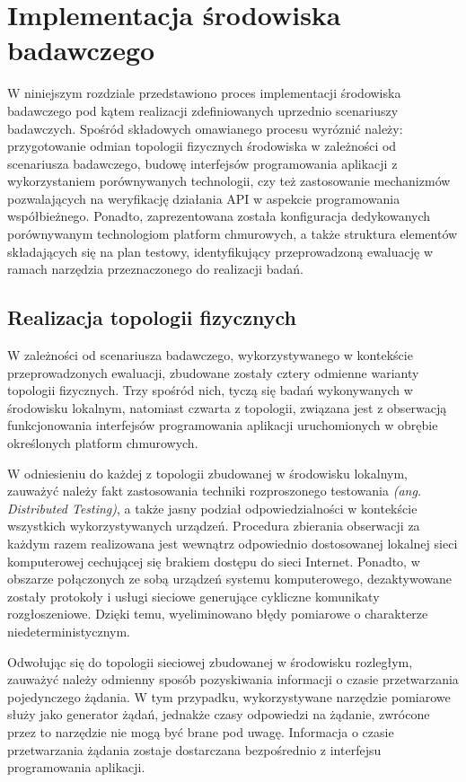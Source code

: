 \chapter{Implementacja środowiska badawczego}
W niniejszym rozdziale przedstawiono proces implementacji środowiska badawczego pod kątem realizacji zdefiniowanych uprzednio scenariuszy badawczych. Spośród składowych omawianego procesu wyróznić należy: przygotowanie odmian topologii fizycznych środowiska w zależności od scenariusza badawczego, budowę interfejsów programowania aplikacji z wykorzystaniem porównywanych technologii, czy też zastosowanie mechanizmów pozwalających na weryfikację działania API w aspekcie programowania współbieżnego. Ponadto, zaprezentowana została konfiguracja dedykowanych porównywanym technologiom platform chmurowych, a także struktura elementów składających się na plan testowy, identyfikujący przeprowadzoną ewaluację w ramach narzędzia przeznaczonego do realizacji badań.    
\section{Realizacja topologii fizycznych}
W zależności od scenariusza badawczego, wykorzystywanego w kontekście przeprowadzonych ewaluacji, zbudowane zostały cztery odmienne warianty topologii fizycznych. Trzy spośród nich, tyczą się badań wykonywanych w środowisku lokalnym, natomiast czwarta z topologii, związana jest z obserwacją funkcjonowania interfejsów programowania aplikacji uruchomionych w obrębie określonych platform chmurowych.

W odniesieniu do każdej z topologii zbudowanej w środowisku lokalnym, zauważyć należy fakt zastosowania techniki rozproszonego testowania \textit{(ang. Distributed Testing)}, a także jasny podział odpowiedzialności w kontekście wszystkich wykorzystywanych urządzeń. Procedura zbierania obserwacji za każdym razem realizowana jest wewnątrz odpowiednio dostosowanej lokalnej sieci komputerowej cechującej się brakiem dostępu do sieci Internet. Ponadto, w obszarze połączonych ze sobą urządzeń systemu komputerowego, dezaktywowane zostały protokoły i usługi sieciowe generujące cykliczne komunikaty rozgłoszeniowe. Dzięki temu, wyeliminowano błędy pomiarowe o charakterze niedeterministycznym.

Odwołując się do topologii sieciowej zbudowanej w środowisku rozległym, zauważyć należy odmienny sposób pozyskiwania informacji o czasie przetwarzania pojedynczego żądania. W tym przypadku, wykorzystywane narzędzie pomiarowe służy jako generator żądań, jednakże czasy odpowiedzi na żądanie, zwrócone przez to narzędzie nie mogą być brane pod uwagę. Informacja o czasie przetwarzania żądania zostaje dostarczana bezpośrednio z interfejsu programowania aplikacji.

